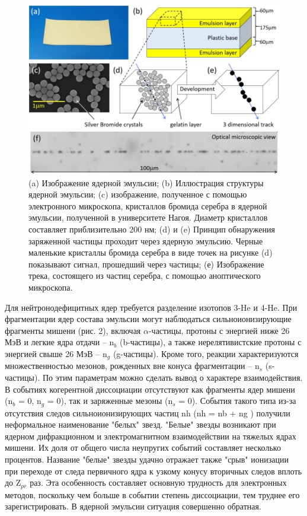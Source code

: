 \documentclass[fontsize=14pt]{scrarticle}
\begin{document}
\begin{figure}[!ht]
\centerline{\includegraphics[scale=.4]{Figure1-1.png}}
\label{figure1-1}
\caption{(a) Изображение ядерной эмульсии; (b) Иллюстрация структуры ядерной эмульсии; (c) изображение, полученное с помощью электронного микроскопа, кристаллов бромида серебра в ядерной эмульсии, полученной в университете Нагоя. Диаметр кристаллов составляет приблизительно 200 нм; (d) и (e) Принцип обнаружения заряженной частицы проходит через ядерную эмульсию. Черные маленькие кристаллы бромида серебра в виде точек на рисунке (d) показывают сигнал, прошедший через частицы; (е) Изображение трека, состоящего из частиц серебра, с помощью аноптического микроскопа.}
\end{figure}

Для нейтронодефицитных ядер требуется разделение изотопов 3-He и 4-He. При фрагментации ядер состава эмульсии могут наблюдаться сильноионизирующие фрагменты мишени (рис. 2), включая $\alpha$-частицы, протоны с энергией ниже 26 МэВ и легкие ядра отдачи – n$_{b}$ (b-частицы), а также нерелятивистские протоны с энергией свыше 26 МэВ – n$_{g}$ (g-частицы). Кроме того, реакции характеризуются множественностью мезонов, рожденных вне конуса фрагментации – n$_{s}$ (s-частицы). По этим параметрам можно сделать вывод о характере взаимодействия. В событиях когерентной диссоциации отсутствуют как фрагменты ядер мишени (n$_{b}$ = 0, n$_{g}$ = 0), так и заряженные мезоны (n$_{s}$ = 0). События такого типа из-за отсутствия следов сильноионизирующих частиц nh (nh = nb + ng ) получили неформальное наименование "белых" звезд. "Белые" звезды возникают при ядерном дифракционном и электромагнитном взаимодействии на тяжелых ядрах мишени. Их доля от общего числа неупругих событий составляет несколько процентов. Название "белые" звезды удачно отражает также "срыв" ионизации при переходе от следа первичного ядра к узкому конусу вторичных следов вплоть до Z$_{pr}$ раз. Эта особенность составляет основную трудность для электронных методов, поскольку чем больше в событии степень диссоциации, тем труднее его зарегистрировать. В ядерной эмульсии ситуация совершенно обратная. 	
\end{document}
